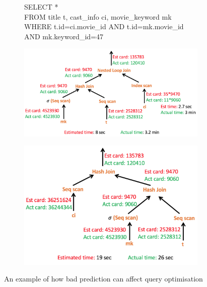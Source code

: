 \documentclass{article}
\begin{document}
	\begin{figure}
		\begin{subfigure}{\linewidth}
		\centering
		\begin{boxedminipage}{.63\textwidth}     
				\small{
					{\sf \hspace*{0.05in} SELECT * \\
					\hspace*{0.05in} FROM title t, cast\_info ci, movie\_keyword mk\\
					\hspace*{0.05in} WHERE t.id=ci.movie\_id AND t.id=mk.movie\_id AND mk.keyword\_id=47}
				}
			\end{boxedminipage}
		\label{fig:sqlquery2}
	\end{subfigure}
	\begin{subfigure}{.5\linewidth}
		\centering
		\includegraphics[scale=0.34]{./figs/2a.png}
		\label{fig:query2p1}
	\end{subfigure}
	\begin{subfigure}{.5\linewidth}
		\centering
		\includegraphics[scale=0.3]{./figs/2b.png}
		\label{fig:query2p2}
	\end{subfigure}
	\caption{An example of how bad prediction can affect query optimisation}
	\label{fig:query_op}
\end{figure}
\end{document}
